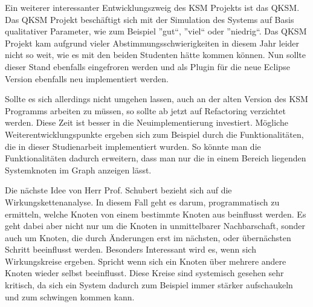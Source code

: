 Ein weiterer interessanter Entwicklungszweig des KSM Projekts ist das QKSM. Das QKSM Projekt beschäftigt sich mit der Simulation des Systems auf Basis qualitativer Parameter, wie zum Beispiel ''gut``, ''viel`` oder ''niedrig``. Das QKSM Projekt kam aufgrund vieler Abstimmungsschwierigkeiten in diesem Jahr leider nicht so weit, wie es mit den beiden Studenten hätte kommen können. Nun sollte dieser Stand ebenfalls eingefroren werden und als Plugin für die neue Eclipse Version ebenfalls neu implementiert werden.

Sollte es sich allerdings nicht umgehen lassen, auch an der alten Version des KSM Programms arbeiten zu müssen, so sollte ab jetzt auf Refactoring verzichtet werden. Diese Zeit ist besser in die Neuimplementierung investiert. Mögliche Weiterentwicklungspunkte ergeben sich zum Beispiel durch die Funktionalitäten, die in dieser Studienarbeit implementiert wurden. So könnte man die Funktionalitäten dadurch erweitern, dass man nur die in einem Bereich liegenden Systemknoten im Graph anzeigen lässt. 

Die nächste Idee von Herr Prof. Schubert bezieht sich auf die Wirkungskettenanalyse. In diesem Fall geht es darum, programmatisch zu ermitteln, welche Knoten von einem bestimmte Knoten aus beinflusst werden. Es geht dabei aber nicht nur um die Knoten in unmittelbarer Nachbarschaft, sonder auch um Knoten, die durch Änderungen erst im nächsten, oder übernächsten Schritt beeinflusst werden. Besonders Interessant wird es, wenn sich Wirkungskreise ergeben. Spricht wenn sich ein Knoten über mehrere andere Knoten wieder selbst beeinflusst. Diese Kreise sind systemisch gesehen sehr kritisch, da sich ein System dadurch zum Beispiel immer stärker aufschaukeln und zum schwingen kommen kann.